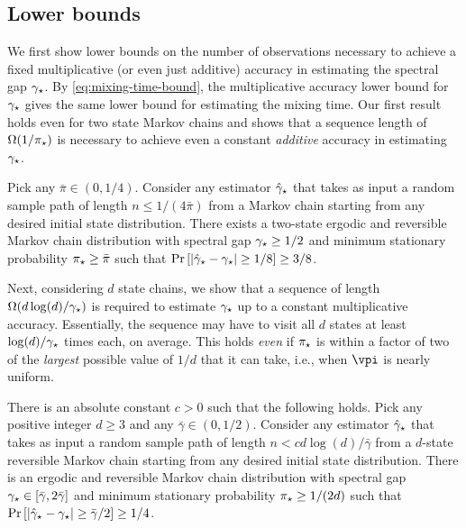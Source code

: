 
\subsection{Lower bounds}
\label{sec:rates-lower}
We first show lower bounds on the number of observations necessary to
achieve a fixed multiplicative (or even just additive) accuracy in
estimating the spectral gap $\gamma_{\star}$.
By \cref{eq:mixing-time-bound}, the multiplicative accuracy lower
bound for $\gamma_{\star}$ gives the same lower bound for estimating the mixing
time.
Our first result holds even for two state Markov chains and shows that a sequence length of $\Omega(1/\pi_{\star})$
is necessary to achieve even a constant \emph{additive} accuracy in estimating $\gamma_{\star}$.
\begin{theorem}
  \label{thm:lb-pimin}
  Pick any $\bar\pi \in (0,1/4)$.
  Consider any estimator $\hat\gamma_{\star}$ that takes as input a random sample
  path of length $n \leq 1/(4\bar\pi)$ from a Markov chain starting
  from any desired initial state distribution.
  There exists a two-state ergodic and reversible Markov chain
  distribution with spectral gap $\gamma_{\star} \geq 1/2$ and minimum
  stationary probability $\pi_{\star} \geq \bar\pi$ such that
  $\Pr\left[ |\hat\gamma_{\star} - \gamma_{\star}| \geq 1/8 \right] \geq 3/8$.
\end{theorem}
Next, considering $d$ state chains, we show that 
a sequence of length $\Omega(d\log(d)/\gamma_{\star})$ is required
to estimate $\gamma_{\star}$ up to a constant multiplicative accuracy.
Essentially, the sequence may have to visit all $d$ states at least
$\log(d)/\gamma_{\star}$ times each, on average.
This holds \emph{even} if $\pi_{\star}$ is within a factor of two of the
\emph{largest} possible value of $1/d$ that it can take, i.e., when
$\vpi$ is nearly uniform.
\begin{theorem}
  \label{thm:lb-gap}
  There is an absolute constant $c>0$ such that the following holds.
  Pick any positive integer $d \geq 3$ and any $\bar\gamma \in
  (0,1/2)$.
  Consider any estimator $\hat\gamma_{\star}$ that takes as input a random sample
  path of length $n < c d\log(d) / \bar\gamma$ from a $d$-state
  reversible Markov chain starting from any desired initial state
  distribution.
  There is an ergodic and reversible Markov chain distribution
  with spectral gap $\gamma_{\star} \in [\bar\gamma,2\bar\gamma]$ and minimum
  stationary probability $\pi_{\star} \geq 1/(2d)$ such that
  $\Pr\left[ |\hat\gamma_{\star} - \gamma_{\star}| \geq \bar\gamma/2\right] \geq 1/4$.
\end{theorem}

